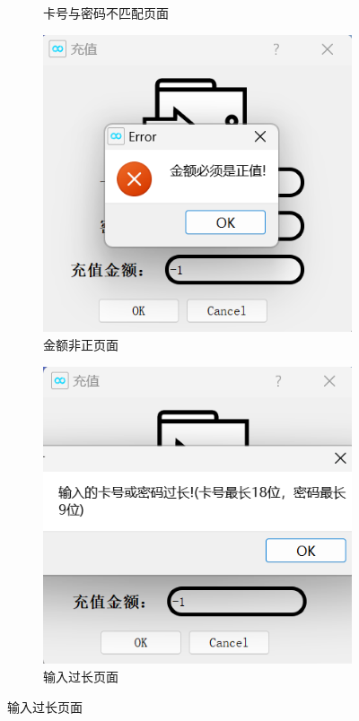 \documentclass{article}
\begin{document}
\begin{figure}[htbp]
\begin{subfigure}{0.24\linewidth}
            \caption{卡号与密码不匹配页面}
            \label{addmeny_id_password_error}
        \end{subfigure}
        \centering
        \begin{subfigure}{0.24\linewidth}
            \centering
            \includegraphics[width=\linewidth]{figure/addmoney_less _zero.png}
            \caption{金额非正页面}
            \label{addmoney_less_zero}
        \end{subfigure}
        \centering
        \begin{subfigure}{0.24\linewidth}
            \centering
            \includegraphics[width=\linewidth]{figure/addmoney_too_long.png}
            \caption{输入过长页面}
            \label{addmoney_too_long}
        \end{subfigure}
    \end{figure}
\end{document}
